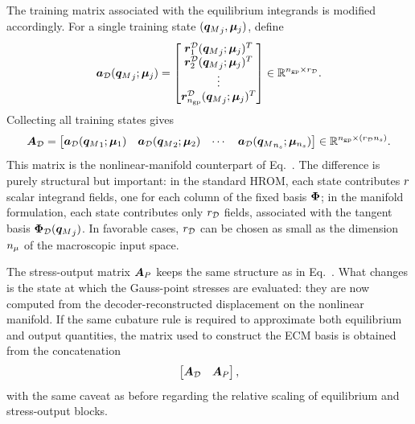 \documentclass[11pt,a4paper]{article}
\begin{document}
The training matrix associated with the equilibrium integrands is modified
accordingly. For a single training state $({\bm{q}_M}_j,\bm{\mu}_j)$, define
\begin{equation}
\label{eq:aforceD_single_state}
\bm{a}_{\mathcal{D}}({\bm{q}_M}_j;\bm{\mu}_j)
=
\begin{bmatrix}
\bm{r}^{\mathcal{D}}_{1}({\bm{q}_M}_j;\bm{\mu}_j)^T\\
\bm{r}^{\mathcal{D}}_{2}({\bm{q}_M}_j;\bm{\mu}_j)^T\\
\vdots\\
\bm{r}^{\mathcal{D}}_{n_{\mathrm{gp}}}({\bm{q}_M}_j;\bm{\mu}_j)^T
\end{bmatrix}
\in \mathbb{R}^{n_{\mathrm{gp}}\times r_{\mathcal{D}}}.
\end{equation}
Collecting all training states gives
\begin{equation}
\label{eq:AforceD_training_matrix}
    \bm{A}_{\mathcal{D}}
    =
    \begin{bmatrix}
        \bm{a}_{\mathcal{D}}({\bm{q}_M}_1;\bm{\mu}_1) &
        \bm{a}_{\mathcal{D}}({\bm{q}_M}_2;\bm{\mu}_2) &
        \cdots &
        \bm{a}_{\mathcal{D}}({\bm{q}_M}_{n_s};\bm{\mu}_{n_s})
    \end{bmatrix}
    \in \mathbb{R}^{n_{\mathrm{gp}}\times(r_{\mathcal{D}}n_s)}.
\end{equation}
This matrix is the nonlinear-manifold counterpart of
Eq.~. The difference is purely structural but important:
in the standard HROM, each state contributes $r$ scalar integrand fields,
one for each column of the fixed basis $\bm{\Phi}$; in the manifold formulation,
each state contributes only $r_{\mathcal{D}}$ fields, associated with the tangent basis
$\bm{\Phi}_{\mathcal{D}}({\bm{q}_M}_j)$. In favorable cases, $r_{\mathcal{D}}$ can be chosen as small as the
dimension $n_{\mu}$ of the macroscopic input space.

The stress-output matrix $\bm{A}_{P}$ keeps the same structure as in
Eq.~. What changes is the state at which the
Gauss-point stresses are evaluated: they are now computed from the
decoder-reconstructed displacement on the nonlinear manifold. If the same
cubature rule is required to approximate both equilibrium and output
quantities, the matrix used to construct the ECM basis is obtained from the
concatenation
\begin{equation}
\label{eq:manifold_fixed_ECM_training_matrix}
    \begin{bmatrix}
    \bm{A}_{\mathcal{D}} & \bm{A}_{P}
    \end{bmatrix},
\end{equation}
with the same caveat as before regarding the relative scaling of equilibrium
and stress-output blocks.

\end{document}
